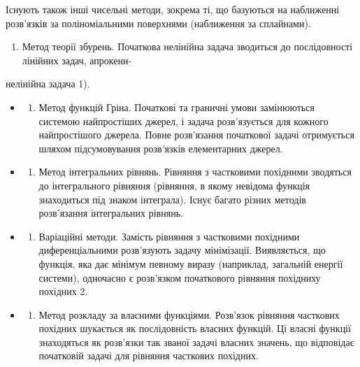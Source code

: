 \documentclass[
]{article}
\providecommand{\tightlist}{%
  \setlength{\itemsep}{0pt}\setlength{\parskip}{0pt}}
\begin{document}
Існують також інші чисельні методи, зокрема ті, що базуються на
наближенні розв'язків за поліноміальними поверхнями (наближення за
сплайнами).

\begin{enumerate}
\def\labelenumi{\arabic{enumi}.}
\setcounter{enumi}{5}
\tightlist
\item
  Метод теорії збурень. Початкова нелінійна задача зводиться до
  послідовності лінійних задач, апрокенн-
\end{enumerate}

нелінійна задача 1).

\begin{itemize}
\tightlist
\item
  \begin{enumerate}
  \def\labelenumi{\arabic{enumi}.}
  \setcounter{enumi}{6}
  \tightlist
  \item
    Метод функцій Гріна. Початкові та граничні умови замінюються
    системою найпростіших джерел, і задача розв'язується для кожного
    найпростішого джерела. Повне розв'язання початкової задачі
    отримується шляхом підсумовування розв'язків елементарних джерел.
  \end{enumerate}
\item
  \begin{enumerate}
  \def\labelenumi{\arabic{enumi}.}
  \setcounter{enumi}{7}
  \tightlist
  \item
    Метод інтегральних рівнянь. Рівняння з частковими похідними
    зводяться до інтегрального рівняння (рівняння, в якому невідома
    функція знаходиться під знаком інтеграла). Існує багато різних
    методів розв'язання інтегральних рівнянь.
  \end{enumerate}
\item
  \begin{enumerate}
  \def\labelenumi{\arabic{enumi}.}
  \setcounter{enumi}{8}
  \tightlist
  \item
    Варіаційні методи. Замість рівняння з частковими похідними
    диференціальними розв'язують задачу мінімізації. Виявляється, що
    функція, яка дає мінімум певному виразу (наприклад, загальній
    енергії системи), одночасно є розв'язком початкового рівняння
    похідниху похідних 2.
  \end{enumerate}
\item
  \begin{enumerate}
  \def\labelenumi{\arabic{enumi}.}
  \setcounter{enumi}{9}
  \tightlist
  \item
    Метод розкладу за власними функціями. Розв'язок рівняння часткових
    похідних шукається як послідовність власних функцій. Ці власні
    функції знаходяться як розв'язки так званої задачі власних значень,
    що відповідає початковій задачі для рівняння часткових похідних.
  \end{enumerate}
\end{itemize}
\end{document}
